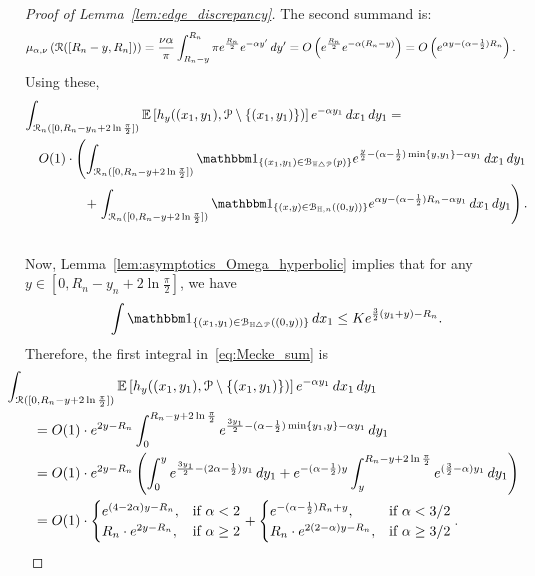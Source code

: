 \begin{proof}[Proof of Lemma~\ref{lem:edge_discrepancy}]
The second summand is: 
\begin{align*}
	\mu_{\alpha,\nu} \left( {\mathcal R}([R_n - y,R_n]) \right) 
    &= \frac{\nu \alpha}{\pi} \int_{R_n - y}^{R_n} \pi e^{\frac{R_n}{2}} e^{-\alpha y'} \, dy' 
    	= O\left(e^{\frac{R_n}{2}} e^{-\alpha (R_n-y)}\right) = O\left(e^{\alpha y - (\alpha - \frac{1}{2})R_n}\right). 
\end{align*}
Using these, 
\begin{eqnarray} 
	\lefteqn{\int_{\Rcal_n ([0, R_n - y_n + 2 \ln \frac{\pi}{2}])} \Exp{h_y((x_1,y_1), \Pcal \setminus \{(x_1,y_1)\})} 
    e^{-\alpha y_1} \, dx_1 \, dy_1 =}  \nonumber \\
	& & O(1) \cdot \left(\int_{\Rcal_n ([0, R_n - y+ 2 \ln \frac{\pi}{2}])} \ind{(x_1,y_1) \in \BallSym{p}} 		e^{\frac{y}{2} - (\alpha - \frac{1}{2}) \min \{y,y_1\} - \alpha y_1} \, dx_1 \, dy_1 \right.  \nonumber \\ 
	& & \hspace{1cm}+\left. \int_{\Rcal_n ([0, R_n - y + 2 \ln \frac{\pi}{2}])} 
    	\ind{(x,y) \in \BallHyp{(0,y)}} 
    	e^{\alpha y - (\alpha - \frac{1}{2})R_n - \alpha y_1} \, dx_1 \, dy_1\right). \nonumber \\
	& &\label{eq:Mecke_sum}
\end{eqnarray}
Now, Lemma~\ref{lem:asymptotics_Omega_hyperbolic} implies that 
for any $y \in [0, R_n - y_n + 2 \ln \frac{\pi}{2}]$, we have 
\[ 
	\int \ind{(x_1,y_1) \in \BallSym{(0,y)}} \, dx_1 \leq K e^{\frac{3}{2} (y_1 + y) - R_n}.
\]
Therefore, the first integral in~\eqref{eq:Mecke_sum} is 
\begin{align*}
	&\hspace{-20pt}\int_{\Rcal ([0, R_n - y + 2 \ln \frac{\pi}{2}])} \Exp{h_y((x_1,y_1), \Pcal \setminus \{(x_1,y_1)\})} 
    	e^{-\alpha y_1} \, dx_1 \, dy_1 \\
	&= O(1) \cdot e^{2 y - R_n} \int_{0}^{R_n - y + 2 \ln \frac{\pi}{2}} 
    	e^{\frac{3y_1}{2} - (\alpha - \frac{1}{2})\min\{y_1,y\} - \alpha y_1} \, dy_1 \\
 	&=  O(1) \cdot e^{2 y - R_n} \left( \int_{0}^{y} e^{\frac{3y_1}{2} - (2\alpha - \frac{1}{2})y_1} \, dy_1 
 		+ e^{-(\alpha-\frac{1}{2}) y}\int_{y}^{R_n - y + 2 \ln \frac{\pi}{2}} e^{(\frac{3}{2} - \alpha) y_1} \, dy_1 \right)\\
  	&= O(1) \cdot 
	\begin{cases}
	e^{(4-2\alpha) y - R_n}, & \mbox{if $\alpha < 2$} \\
	R_n \cdot e^{2y - R_n}, & \mbox{if $\alpha \geq 2$}
	\end{cases}
	+
	\begin{cases}
	e^{-(\alpha - \frac{1}{2})R_n +y}, & \mbox{if $\alpha < 3/2$} \\
	R_n \cdot  e^{2(2-\alpha)y - R_n}, & \mbox{if $\alpha \geq 3/2$}
	\end{cases}.
\end{align*}


\end{proof}
